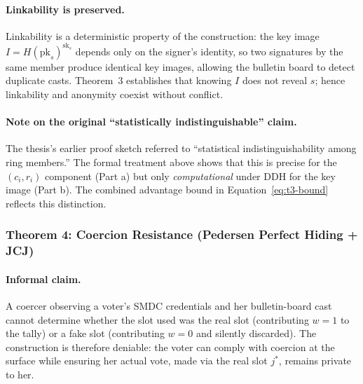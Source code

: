 \paragraph{Linkability is preserved.} Linkability is a deterministic property of the construction: the key image $I = H(\text{pk}_s)^{\text{sk}_s}$ depends only on the signer's identity, so two signatures by the same member produce identical key images, allowing the bulletin board to detect duplicate casts. Theorem~3 establishes that knowing $I$ does not reveal $s$; hence linkability and anonymity coexist without conflict.

\paragraph{Note on the original ``statistically indistinguishable'' claim.} The thesis's earlier proof sketch referred to ``statistical indistinguishability among ring members.'' The formal treatment above shows that this is precise for the $(c_i, r_i)$ component (Part a) but only \emph{computational} under DDH for the key image (Part b). The combined advantage bound in Equation~\eqref{eq:t3-bound} reflects this distinction.

\subsubsection{Theorem 4: Coercion Resistance (Pedersen Perfect Hiding + JCJ)}
\label{subsubsec:t4-coercion-resistance}
\label{subsec:t4-coercion-game}

\paragraph{Informal claim.} A coercer observing a voter's SMDC credentials and her bulletin-board cast cannot determine whether the slot used was the real slot (contributing $w = 1$ to the tally) or a fake slot (contributing $w = 0$ and silently discarded). The construction is therefore deniable: the voter can comply with coercion at the surface while ensuring her actual vote, made via the real slot $j^*$, remains private to her.

